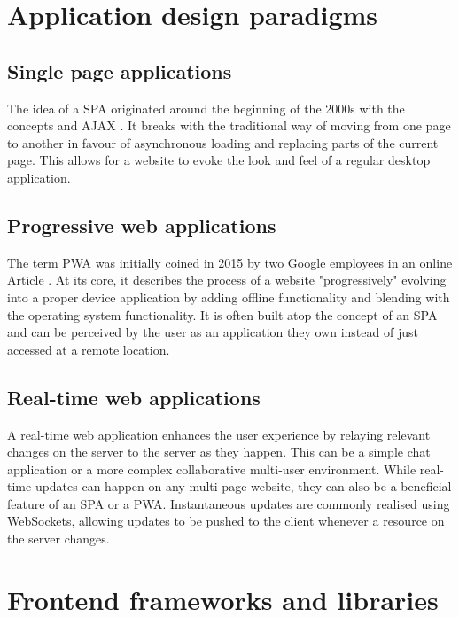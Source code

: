 \section{Application design paradigms}

\subsection{Single page applications}

The idea of a \ac{SPA} originated around the beginning of the 2000s with the concepts  \parencite{innerBrowsing} and \ac{AJAX} \parencite{ajaxNewApproach}. It breaks with the traditional way of moving from one page to another in favour of asynchronous loading and replacing parts of the current page. This allows for a website to evoke the look and feel of a regular desktop application.

\subsection{Progressive web applications}

The term \ac{PWA} was initially coined in 2015 by two Google employees in an online Article \parencite{progressiveWebApplications}. At its core, it describes the process of a website "progressively" evolving into a proper device application by adding offline functionality and blending with the operating system functionality. It is often built atop the concept of an \ac{SPA} and can be perceived by the user as an application they own instead of just accessed at a remote location.

\subsection{Real-time web applications}

A real-time web application enhances the user experience by relaying relevant changes on the server to the server as they happen. This can be a simple chat application or a more complex collaborative multi-user environment. While real-time updates can happen on any multi-page website, they can also be a beneficial feature of an \ac{SPA} or a \ac{PWA}. Instantaneous updates are commonly realised using WebSockets, allowing updates to be pushed to the client whenever a resource on the server changes.



\section{Frontend frameworks and libraries}

